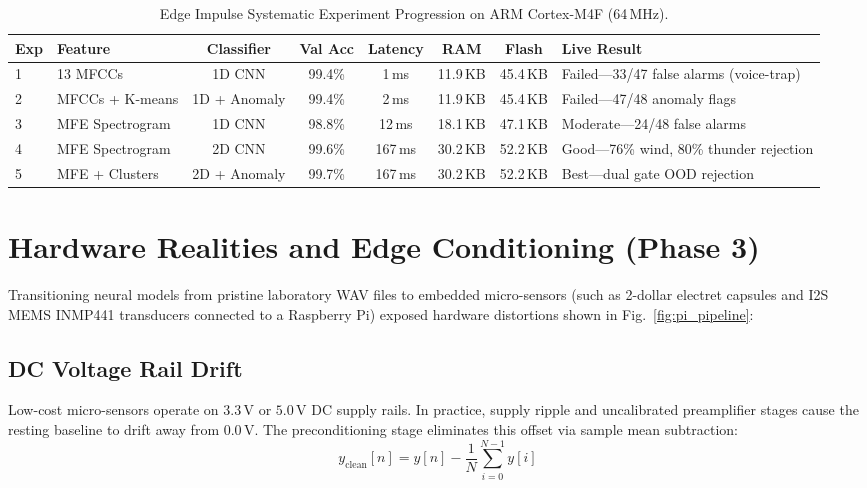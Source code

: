 \documentclass[conference]{IEEEtran}
\begin{document}
\begin{table}[!t]
\centering
\caption{Edge Impulse Systematic Experiment Progression on ARM Cortex-M4F (64\,MHz).}
\label{tab:edge_impulse}
\small
\begin{tabular}{llcccccp{3.5cm}}
\toprule
\textbf{Exp} & \textbf{Feature} & \textbf{Classifier} & \textbf{Val Acc} & \textbf{Latency} & \textbf{RAM} & \textbf{Flash} & \textbf{Live Result} \\
\midrule
1 & 13 MFCCs & 1D CNN & 99.4\% & 1\,ms & 11.9\,KB & 45.4\,KB & Failed---33/47 false alarms (voice-trap) \\
2 & MFCCs + K-means & 1D + Anomaly & 99.4\% & 2\,ms & 11.9\,KB & 45.4\,KB & Failed---47/48 anomaly flags \\
3 & MFE Spectrogram & 1D CNN & 98.8\% & 12\,ms & 18.1\,KB & 47.1\,KB & Moderate---24/48 false alarms \\
4 & MFE Spectrogram & 2D CNN & 99.6\% & 167\,ms & 30.2\,KB & 52.2\,KB & Good---76\% wind, 80\% thunder rejection \\
5 & MFE + Clusters & 2D + Anomaly & 99.7\% & 167\,ms & 30.2\,KB & 52.2\,KB & Best---dual gate OOD rejection \\
\bottomrule
\end{tabular}
\end{table}

\section{Hardware Realities and Edge Conditioning (Phase 3)}
\label{sec:hardware_conditioning}
Transitioning neural models from pristine laboratory WAV files to embedded micro-sensors (such as 2-dollar electret capsules and I2S MEMS INMP441 transducers connected to a Raspberry Pi) exposed hardware distortions shown in Fig.~\ref{fig:pi_pipeline}:

\subsection{DC Voltage Rail Drift}
Low-cost micro-sensors operate on $3.3\,\text{V}$ or $5.0\,\text{V}$ DC supply rails. In practice, supply ripple and uncalibrated preamplifier stages cause the resting baseline to drift away from $0.0\,\text{V}$. The preconditioning stage eliminates this offset via sample mean subtraction:
\begin{equation}
    y_{\text{clean}}[n] = y[n] - \frac{1}{N}\sum_{i=0}^{N-1} y[i]
    \label{eq:dc_strip}
\end{equation}
\end{document}

